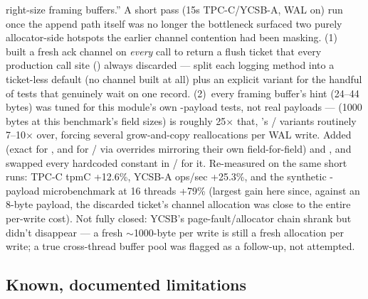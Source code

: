 \documentclass[11pt]{article}
\begin{document}
\begin{itemize}
{        right-size framing buffers.''} A short  pass (15s TPC-C/YCSB-A,
        WAL on) run once the append path itself was no longer the bottleneck surfaced two
        purely allocator-side hotspots the earlier channel contention had been masking.
        (1)~ built a fresh  ack channel on
        \emph{every} call to return a flush ticket that every production call site
        () always discarded --- split each logging method
        into a ticket-less default (no channel built at all) plus an explicit
         variant for the handful of tests that genuinely wait on one
        record. (2)~every framing buffer's  hint (24--44 bytes)
        was tuned for this module's own -payload tests, not real payloads ---
         (1000 bytes at this benchmark's field sizes) is roughly 25$\times$
        that, 's / variants routinely 7--10$\times$
        over, forcing several grow-and-copy reallocations per WAL write. Added
         (exact for , and for
        / via overrides mirroring their own 
        field-for-field) and , and swapped every
        hardcoded constant in / for it. Re-measured
        on the same short runs: TPC-C tpmC +12.6\%, YCSB-A ops/sec +25.3\%, and the
        synthetic -payload  microbenchmark at 16 threads +79\%
        (largest gain here since, against an 8-byte payload, the discarded ticket's channel
        allocation was close to the entire per-write cost). Not fully closed: YCSB's
        page-fault/allocator chain shrank but didn't disappear --- a fresh $\sim$1000-byte
         per write is still a fresh allocation per write; a true cross-thread
        buffer pool was flagged as a follow-up, not attempted.
\end{itemize}

\subsection{Known, documented limitations}
\end{document}
